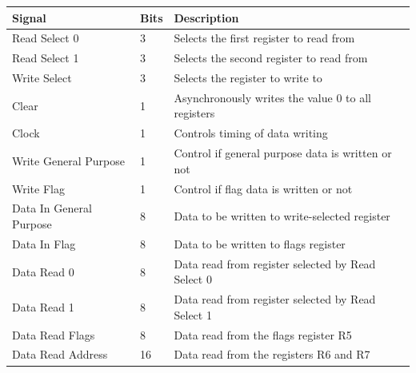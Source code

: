 \begin{table}[H]
    \centering
    \begin{tabular}{|l|l|l|} 
        \hline
        \textbf{\textbf{Signal}} & \textbf{Bits} & \textbf{Description}                                \\ 
        \hline
        Read Select 0            & 3             & Selects the first register to read from             \\ 
        \hline
        Read Select 1            & 3             & Selects the second register to read from            \\ 
        \hline
        Write Select             & 3             & Selects the register to write to                    \\ 
        \hline
        Clear                    & 1             & Asynchronously writes the value 0 to all registers  \\ 
        \hline
        Clock                    & 1             & Controls timing of data writing                     \\ 
        \hline
        Write General Purpose    & 1             & Control if general purpose data is written or not   \\ 
        \hline
        Write Flag               & 1             & Control if flag data is written or not              \\ 
        \hline
        Data In General Purpose  & 8             & Data to be written to write-selected register       \\ 
        \hline
        Data In Flag             & 8             & Data to be written to flags register                \\
        \hline
        Data Read 0              & 8             & Data read from register selected by Read Select 0   \\
        \hline
        Data Read 1              & 8             & Data read from register selected by Read Select 1   \\
        \hline
        Data Read Flags          & 8             & Data read from the flags register R5                \\
        \hline
        Data Read Address        & 16            & Data read from the registers R6 and R7              \\
        \hline
    \end{tabular}
    \label{tab:implementation_logical_register_file_io}
\end{table}

